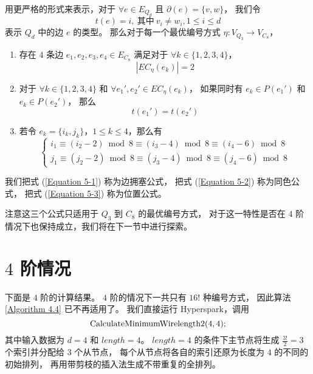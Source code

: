 用更严格的形式来表示，对于 $\forall e \in E_{Q_d}$ 且 $\partial(e) = \{v, w\}$，
我们令
\begin{equation*}
t(e) = i,\ \text{其中}\ v_i \neq w_i, 1 \le i \le d
\end{equation*}
表示 $Q_d$ 中的边 $e$ 的类型。
那么对于每一个最优编号方式 $\eta \colon V_{Q_3} \rightarrow V_{C_8}$，
\begin{enumerate}[(1)]
	\item 存在 $4$ 条边 $e_1, e_2, e_3, e_4 \in E_{C_8}$ 满足对于 $\forall k \in \{1, 2, 3, 4\}$，
		\begin{equation}
		\label{Equation 5-1}
		|EC_\eta(e_k)| = 2
		\end{equation}
	\item 对于 $\forall k \in \{1, 2, 3, 4\}$
		和 $\forall e_1', e_2' \in EC_\eta(e_k)$，
		如果同时有 $e_k \in P(e_1')$ 和 $e_k \in P(e_2')$，
		那么
		\begin{equation}
		\label{Equation 5-2}
		t(e_1') = t(e_2')
		\end{equation}
	\item 若令 $e_k = \{i_k, j_k\}$，$1 \le k \le 4$，那么有
		\begin{equation}
		\label{Equation 5-3}
		\begin{cases}
		i_1 \equiv (i_2 - 2) \bmod 8 \equiv (i_3 - 4) \bmod 8 \equiv (i_4 - 6) \bmod 8 \\
		j_1 \equiv (j_2 - 2) \bmod 8 \equiv (j_3 - 4) \bmod 8 \equiv (j_4 - 6) \bmod 8
		\end{cases}
		\end{equation}
\end{enumerate}

我们把式 (\ref{Equation 5-1}) 称为边拥塞公式，
把式 (\ref{Equation 5-2}) 称为同色公式，
把式 (\ref{Equation 5-3}) 称为位置公式。

注意这三个公式只适用于 $Q_3$ 到 $C_8$ 的最优编号方式，
对于这一特性是否在 $4$ 阶情况下也保持成立，我们将在下一节中进行探索。

\section{$4$ 阶情况}
\label{Section 5.3}

下面是 $4$ 阶的计算结果。
$4$ 阶的情况下一共只有 $16 !$ 种编号方式，
因此算法 \ref{Algorithm 4.4} 已不再适用了。
我们直接运行 Hyperspark，调用
\begin{equation*}
\textnormal{CalculateMinimumWirelength2}(4, 4);
\end{equation*}
其中输入数据为 $d = 4$ 和 $length = 4$。
$length = 4$ 的条件下主节点将生成 $\frac{3 !}{2} = 3$ 个索引并分配给 $3$ 个从节点，
每个从节点将各自的索引还原为长度为 $4$ 的不同的初始排列，
再用带剪枝的插入法生成不带重复的全排列。

